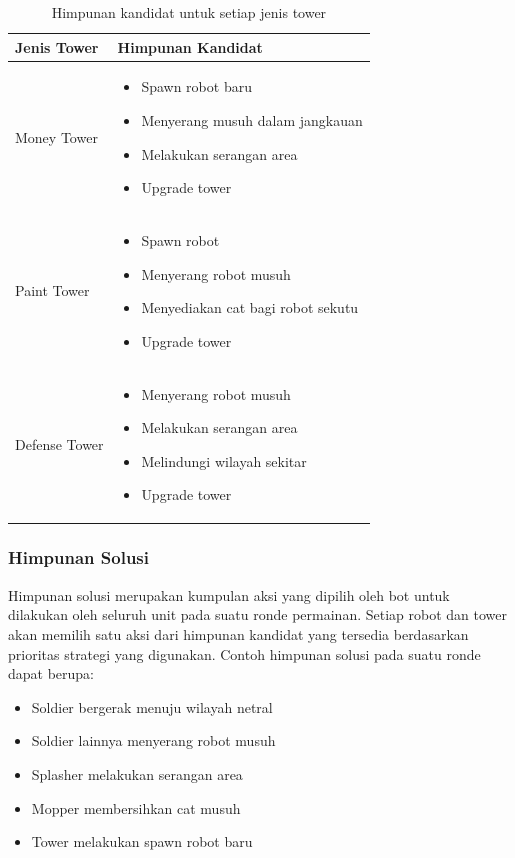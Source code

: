 \documentclass{article}
\begin{document}
\begin{table}[H]
\centering
\begin{tabular}{|p{3cm}|p{11cm}|}
\hline
\textbf{Jenis Tower} & \textbf{Himpunan Kandidat} \\
\hline
Money Tower &
\begin{itemize}
\item Spawn robot baru
\item Menyerang musuh dalam jangkauan
\item Melakukan serangan area
\item Upgrade tower
\end{itemize}
\\
\hline
Paint Tower &
\begin{itemize}
\item Spawn robot
\item Menyerang robot musuh
\item Menyediakan cat bagi robot sekutu
\item Upgrade tower
\end{itemize}
\\
\hline
Defense Tower &
\begin{itemize}
\item Menyerang robot musuh
\item Melakukan serangan area
\item Melindungi wilayah sekitar
\item Upgrade tower
\end{itemize}
\\
\hline
\end{tabular}
\caption{Himpunan kandidat untuk setiap jenis tower}
\end{table}

\subsubsection{Himpunan Solusi}

Himpunan solusi merupakan kumpulan aksi yang dipilih oleh bot untuk dilakukan oleh seluruh unit pada suatu ronde permainan. Setiap robot dan tower akan memilih satu aksi dari himpunan kandidat yang tersedia berdasarkan prioritas strategi yang digunakan.
Contoh himpunan solusi pada suatu ronde dapat berupa:

\begin{itemize}
\item Soldier bergerak menuju wilayah netral
\item Soldier lainnya menyerang robot musuh
\item Splasher melakukan serangan area
\item Mopper membersihkan cat musuh
\item Tower melakukan spawn robot baru
\end{itemize}
\end{document}
